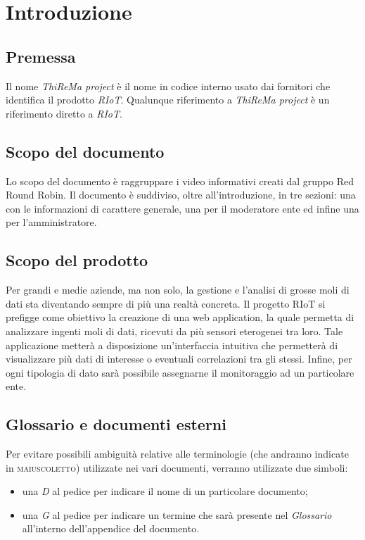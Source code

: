 \section{Introduzione}
	\subsection{Premessa}
		Il nome \textit{ThiReMa project} è il nome in codice interno usato dai fornitori che identifica il prodotto \textit{RIoT}. Qualunque riferimento a \textit{ThiReMa project} è un riferimento diretto a \textit{RIoT}. 
	\subsection{Scopo del documento}
		Lo scopo del documento è raggruppare i video informativi creati dal gruppo Red Round Robin. Il documento è suddiviso, oltre all'introduzione, in tre sezioni: una con le informazioni di carattere generale, una per il moderatore ente ed infine una per l'amministratore.	
	\subsection{Scopo del prodotto}
		Per grandi e medie aziende, ma non solo, la gestione e l'analisi di grosse moli di dati sta diventando sempre di più una realtà concreta.
	 	\newline
		Il progetto RIoT si prefigge come obiettivo la creazione di una web application, la quale permetta di analizzare ingenti moli di dati, ricevuti da più sensori eterogenei tra loro. Tale applicazione metterà a disposizione un'interfaccia intuitiva che permetterà di visualizzare più dati di interesse o eventuali correlazioni tra gli stessi. Infine, per ogni tipologia di dato sarà possibile assegnarne il monitoraggio ad un particolare ente.	
	\subsection{Glossario e documenti esterni}
		Per evitare possibili ambiguità relative alle terminologie (che andranno indicate in \textsc{maiuscoletto}) utilizzate nei vari documenti, verranno utilizzate due simboli:
		\begin{itemize}
			\item una \textit{D} al pedice per indicare il nome di un particolare documento;
			\item una \textit{G} al pedice per indicare un termine che sarà presente nel \textit{Glossario} all'interno dell'appendice del documento.
		\end{itemize}
	